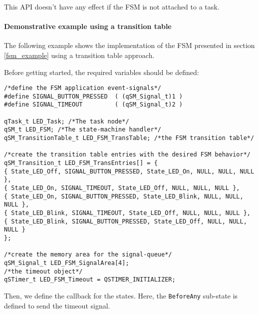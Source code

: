 \begin{tcolorbox}
\HandRight This API doesn't have any effect if the FSM is not attached to a task.
\end{tcolorbox}

\paragraph{Demonstrative example using a transition table}
The following example shows the implementation of the FSM presented in section \ref{fsm_example} using a transition table approach.

Before getting started, the required variables should be defined: \\

\begin{lstlisting}[style=CStyle]
/*define the FSM application event-signals*/
#define SIGNAL_BUTTON_PRESSED  ( (qSM_Signal_t)1 )
#define SIGNAL_TIMEOUT         ( (qSM_Signal_t)2 )

qTask_t LED_Task; /*The task node*/
qSM_t LED_FSM; /*The state-machine handler*/
qSM_TransitionTable_t LED_FSM_TransTable; /*the FSM transition table*/

/*create the transition table entries with the desired FSM behavior*/
qSM_Transition_t LED_FSM_TransEntries[] = {
{ State_LED_Off, SIGNAL_BUTTON_PRESSED, State_LED_On, NULL, NULL, NULL },
{ State_LED_On, SIGNAL_TIMEOUT, State_LED_Off, NULL, NULL, NULL },
{ State_LED_On, SIGNAL_BUTTON_PRESSED, State_LED_Blink, NULL, NULL, NULL },
{ State_LED_Blink, SIGNAL_TIMEOUT, State_LED_Off, NULL, NULL, NULL },
{ State_LED_Blink, SIGNAL_BUTTON_PRESSED, State_LED_Off, NULL, NULL, NULL }
};

/*create the memory area for the signal-queue*/
qSM_Signal_t LED_FSM_SignalArea[4];
/*the timeout object*/
qSTimer_t LED_FSM_Timeout = QSTIMER_INITIALIZER;
\end{lstlisting}

Then, we define the callback for the states. Here, the \lstinline{BeforeAny} sub-state is defined to send the timeout signal. \\

